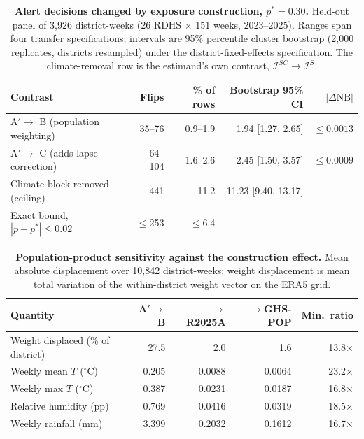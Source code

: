 \documentclass[11pt,a4paper]{article}
\begin{document}
\begin{table}[htbp]
\centering
\caption{\textbf{Alert decisions changed by exposure construction, $p^*=0.30$.} Held-out panel of 3{,}926 district-weeks (26 RDHS $\times$ 151 weeks, 2023--2025). Ranges span four transfer specifications; intervals are 95\% percentile cluster bootstrap (2{,}000 replicates, districts resampled) under the district-fixed-effects specification. The climate-removal row is the estimand's own contrast, $\mathcal I^{SC}\to\mathcal I^{S}$.}
\label{tab:wp5-flips}
{\footnotesize\begin{tabular}{@{}lrrrr@{}}
\toprule
Contrast & Flips & \% of rows & Bootstrap 95\% CI & $|\Delta \mathrm{NB}|$ \\
\midrule
A$'\to$ B (population weighting) & 35--76  & 0.9--1.9  & 1.94 [1.27, 2.65]    & $\le 0.0013$ \\
A$'\to$ C (adds lapse correction) & 64--104 & 1.6--2.6  & 2.45 [1.50, 3.57]    & $\le 0.0009$ \\
Climate block removed (ceiling)   & 441     & 11.2      & 11.23 [9.40, 13.17]  & --- \\
Exact bound, $|p-p^*|\le0.02$     & $\le$253 & $\le$6.4 & ---                  & --- \\
\bottomrule
\end{tabular}}
\end{table}

\begin{table}[htbp]
\centering
\caption{\textbf{Population-product sensitivity against the construction effect.} Mean absolute displacement over 10{,}842 district-weeks; weight displacement is mean total variation of the within-district weight vector on the ERA5 grid.}
\label{tab:wp5-product}
{\footnotesize\begin{tabular}{@{}lrrrr@{}}
\toprule
Quantity & A$'\to$ B & $\to$R2025A & $\to$GHS-POP & Min.\ ratio \\
\midrule
Weight displaced (\% of district) & 27.5  & 2.0    & 1.6    & 13.8$\times$ \\
Weekly mean $T$ ($^{\circ}$C)     & 0.205 & 0.0088 & 0.0064 & 23.2$\times$ \\
Weekly max $T$ ($^{\circ}$C)      & 0.387 & 0.0231 & 0.0187 & 16.8$\times$ \\
Relative humidity (pp)            & 0.769 & 0.0416 & 0.0319 & 18.5$\times$ \\
Weekly rainfall (mm)              & 3.399 & 0.2032 & 0.1612 & 16.7$\times$ \\
\bottomrule
\end{tabular}}
\end{table}
\end{document}
